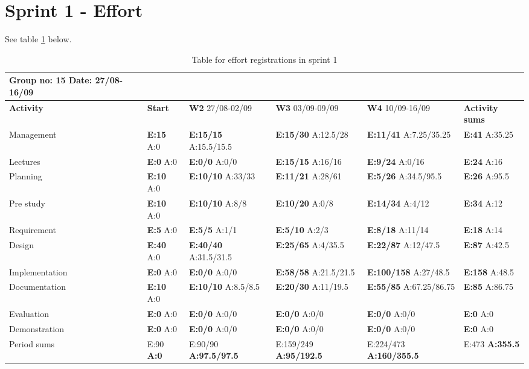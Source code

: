 \section{Sprint 1 - Effort}

See table \ref{tab:effortweekss1} below.
\begin{table}[h!]
\begin{tabularx}{\linewidth}{>{\setlength\hsize{.625\hsize}}X|>{\setlength\hsize{0.3\hsize}}X|>{\setlength\hsize{0.5\hsize}}X|>{\setlength\hsize{0.5\hsize}}X|>{\setlength\hsize{0.5\hsize}}X|>{\setlength\hsize{.3\hsize}}X}
Group no: 15 Date: 27/08-16/09  \\ \hline
\textbf{Activity} & \textbf{Start} & \textbf{W2} 27/08-02/09 & \textbf{W3} 03/09-09/09 & \textbf{W4} 10/09-16/09 & \textbf{Activity sums} \\ \hline \hline
Management & \textbf{E:15} A:0 & \textbf{E:15/15} A:15.5/15.5 & \textbf{E:15/30} A:12.5/28 & \textbf{E:11/41} A:7.25/35.25 & \textbf{E:41} A:35.25  \\ \hline
Lectures & \textbf{E:0} A:0 & \textbf{E:0/0} A:0/0 & \textbf{E:15/15} A:16/16 & \textbf{E:9/24} A:0/16 & \textbf{E:24 } A:16  \\ \hline
Planning & \textbf{E:10} A:0 & \textbf{E:10/10} A:33/33 & \textbf{E:11/21} A:28/61 & \textbf{E:5/26} A:34.5/95.5 & \textbf{E:26 } A:95.5  \\ \hline
Pre study & \textbf{E:10} A:0 & \textbf{E:10/10} A:8/8 & \textbf{E:10/20} A:0/8 & \textbf{E:14/34} A:4/12 & \textbf{E:34 } A:12  \\ \hline
Requirement & \textbf{E:5} A:0 & \textbf{E:5/5} A:1/1 & \textbf{E:5/10} A:2/3 & \textbf{E:8/18} A:11/14 & \textbf{E:18 } A:14  \\ \hline
Design & \textbf{E:40} A:0 & \textbf{E:40/40} A:31.5/31.5 & \textbf{E:25/65} A:4/35.5 & \textbf{E:22/87} A:12/47.5 & \textbf{E:87 } A:42.5  \\ \hline
Implementation & \textbf{E:0} A:0 & \textbf{E:0/0} A:0/0 & \textbf{E:58/58} A:21.5/21.5 & \textbf{E:100/158} A:27/48.5 & \textbf{E:158 } A:48.5  \\ \hline
Documentation & \textbf{E:10} A:0 & \textbf{E:10/10} A:8.5/8.5 & \textbf{E:20/30} A:11/19.5 & \textbf{E:55/85} A:67.25/86.75 & \textbf{E:85 } A:86.75  \\ \hline
Evaluation & \textbf{E:0} A:0 & \textbf{E:0/0} A:0/0 & \textbf{E:0/0} A:0/0 & \textbf{E:0/0} A:0/0 & \textbf{E:0 } A:0  \\ \hline
Demonstration & \textbf{E:0} A:0 & \textbf{E:0/0} A:0/0 & \textbf{E:0/0} A:0/0 & \textbf{E:0/0} A:0/0 & \textbf{E:0 } A:0  \\ \hline
Period sums & E:90 \textbf{A:0} & E:90/90 \textbf{A:97.5/97.5} & E:159/249 \textbf{A:95/192.5} & E:224/473 \textbf{A:160/355.5} & E:473 \textbf{A:355.5} \\ \hline
\end{tabularx}

\caption{Table for effort registrations in sprint 1} \label{tab:effortweekss1}
\end{table}

